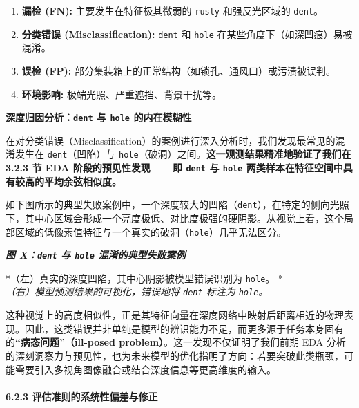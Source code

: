 \documentclass[
]{article}
\begin{document}
\begin{itemize}
\begin{itemize}
\begin{itemize}
      \begin{enumerate}
      \def\labelenumi{\arabic{enumi}.}
      \item
        \textbf{漏检 (FN):} 主要发生在特征极其微弱的 \texttt{rusty}
        和强反光区域的 \texttt{dent}。
      \item
        \textbf{分类错误 (Misclassification):} \texttt{dent} 和
        \texttt{hole} 在某些角度下（如深凹痕）易被混淆。
      \item
        \textbf{误检 (FP):}
        部分集装箱上的正常结构（如锁孔、通风口）或污渍被误判。
      \item
        \textbf{环境影响:} 极端光照、严重遮挡、背景干扰等。
      \end{enumerate}
    \end{itemize}
  \end{itemize}
\end{itemize}

\textbf{深度归因分析：\texttt{dent} 与 \texttt{hole} 的内在模糊性}

在对分类错误（Misclassification）的案例进行深入分析时，我们发现最常见的混淆发生在
\texttt{dent}（凹陷）与
\texttt{hole}（破洞）之间。\textbf{这一观测结果精准地验证了我们在 3.2.3
节 EDA 阶段的预见性发现------即 \texttt{dent} 与 \texttt{hole}
两类样本在特征空间中具有较高的平均余弦相似度。}

如下图所示的典型失败案例中，一个深度较大的凹陷（\texttt{dent}），在特定的侧向光照下，其中心区域会形成一个亮度极低、对比度极强的硬阴影。从视觉上看，这个局部区域的低像素值特征与一个真实的破洞（\texttt{hole}）几乎无法区分。

\emph{\textbf{图 X：\texttt{dent} 与 \texttt{hole} 混淆的典型失败案例}}

*（左）真实的深度凹陷，其中心阴影被模型错误识别为 \texttt{hole}。 *\\
\emph{（右）模型预测结果的可视化，错误地将 \texttt{dent} 标注为
\texttt{hole}。}

这种视觉上的高度相似性，正是其特征向量在深度网络中映射后距离相近的物理表现。因此，这类错误并非单纯是模型的辨识能力不足，而更多源于任务本身固有的\textbf{``病态问题''（ill-posed
problem）}。这一发现不仅证明了我们前期 EDA
分析的深刻洞察力与预见性，也为未来模型的优化指明了方向：若要突破此类瓶颈，可能需要引入多视角图像融合或结合深度信息等更高维度的输入。

\paragraph{\texorpdfstring{\textbf{6.2.3
评估准则的系统性偏差与修正}}{6.2.3 评估准则的系统性偏差与修正}}\label{623-ux8bc4ux4f30ux51c6ux5219ux7684ux7cfbux7edfux6027ux504fux5deeux4e0eux4feeux6b63}
\end{document}
